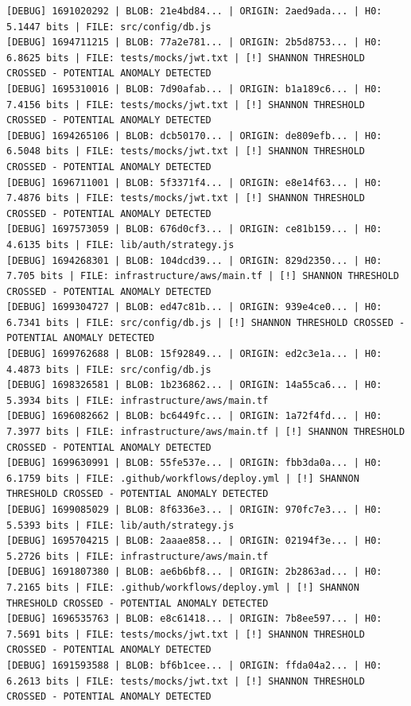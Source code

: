 \documentclass[12pt, a4paper, oneside]{report}
\begin{document}
\newpage
\begin{lstlisting}[basicstyle=\tiny\ttfamily]
[DEBUG] 1691020292 | BLOB: 21e4bd84... | ORIGIN: 2aed9ada... | H0: 5.1447 bits | FILE: src/config/db.js
[DEBUG] 1694711215 | BLOB: 77a2e781... | ORIGIN: 2b5d8753... | H0: 6.8625 bits | FILE: tests/mocks/jwt.txt | [!] SHANNON THRESHOLD CROSSED - POTENTIAL ANOMALY DETECTED
[DEBUG] 1695310016 | BLOB: 7d90afab... | ORIGIN: b1a189c6... | H0: 7.4156 bits | FILE: tests/mocks/jwt.txt | [!] SHANNON THRESHOLD CROSSED - POTENTIAL ANOMALY DETECTED
[DEBUG] 1694265106 | BLOB: dcb50170... | ORIGIN: de809efb... | H0: 6.5048 bits | FILE: tests/mocks/jwt.txt | [!] SHANNON THRESHOLD CROSSED - POTENTIAL ANOMALY DETECTED
[DEBUG] 1696711001 | BLOB: 5f3371f4... | ORIGIN: e8e14f63... | H0: 7.4876 bits | FILE: tests/mocks/jwt.txt | [!] SHANNON THRESHOLD CROSSED - POTENTIAL ANOMALY DETECTED
[DEBUG] 1697573059 | BLOB: 676d0cf3... | ORIGIN: ce81b159... | H0: 4.6135 bits | FILE: lib/auth/strategy.js
[DEBUG] 1694268301 | BLOB: 104dcd39... | ORIGIN: 829d2350... | H0: 7.705 bits | FILE: infrastructure/aws/main.tf | [!] SHANNON THRESHOLD CROSSED - POTENTIAL ANOMALY DETECTED
[DEBUG] 1699304727 | BLOB: ed47c81b... | ORIGIN: 939e4ce0... | H0: 6.7341 bits | FILE: src/config/db.js | [!] SHANNON THRESHOLD CROSSED - POTENTIAL ANOMALY DETECTED
[DEBUG] 1699762688 | BLOB: 15f92849... | ORIGIN: ed2c3e1a... | H0: 4.4873 bits | FILE: src/config/db.js
[DEBUG] 1698326581 | BLOB: 1b236862... | ORIGIN: 14a55ca6... | H0: 5.3934 bits | FILE: infrastructure/aws/main.tf
[DEBUG] 1696082662 | BLOB: bc6449fc... | ORIGIN: 1a72f4fd... | H0: 7.3977 bits | FILE: infrastructure/aws/main.tf | [!] SHANNON THRESHOLD CROSSED - POTENTIAL ANOMALY DETECTED
[DEBUG] 1699630991 | BLOB: 55fe537e... | ORIGIN: fbb3da0a... | H0: 6.1759 bits | FILE: .github/workflows/deploy.yml | [!] SHANNON THRESHOLD CROSSED - POTENTIAL ANOMALY DETECTED
[DEBUG] 1699085029 | BLOB: 8f6336e3... | ORIGIN: 970fc7e3... | H0: 5.5393 bits | FILE: lib/auth/strategy.js
[DEBUG] 1695704215 | BLOB: 2aaae858... | ORIGIN: 02194f3e... | H0: 5.2726 bits | FILE: infrastructure/aws/main.tf
[DEBUG] 1691807380 | BLOB: ae6b6bf8... | ORIGIN: 2b2863ad... | H0: 7.2165 bits | FILE: .github/workflows/deploy.yml | [!] SHANNON THRESHOLD CROSSED - POTENTIAL ANOMALY DETECTED
[DEBUG] 1696535763 | BLOB: e8c61418... | ORIGIN: 7b8ee597... | H0: 7.5691 bits | FILE: tests/mocks/jwt.txt | [!] SHANNON THRESHOLD CROSSED - POTENTIAL ANOMALY DETECTED
[DEBUG] 1691593588 | BLOB: bf6b1cee... | ORIGIN: ffda04a2... | H0: 6.2613 bits | FILE: tests/mocks/jwt.txt | [!] SHANNON THRESHOLD CROSSED - POTENTIAL ANOMALY DETECTED

\end{lstlisting}
\end{document}
